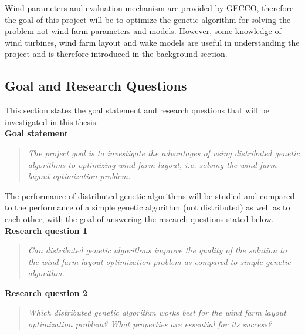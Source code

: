 \noindent Wind parameters and evaluation mechanism are provided by GECCO, therefore the goal of this project will be to optimize the genetic algorithm for solving the problem not wind farm parameters and models. However, some knowledge of wind turbines, wind farm layout and wake models are useful in understanding the project and is therefore introduced in the background section. 


\subsection{Goal and Research Questions}
This section states the goal statement and research questions that will be investigated in this thesis. \\


\noindent \textbf{Goal statement}


\begin{quote}
\textit{The project goal is to investigate the advantages of using distributed genetic algorithms to optimizing wind farm layout, i.e. solving the wind farm layout optimization problem.}
\end{quote}


\noindent The performance of distributed genetic algorithms will be studied and compared to the performance of a simple genetic algorithm (not distributed) as well as to each other, with the goal of answering the research questions stated below.\\


\noindent \textbf{Research question 1}


\begin{quote}
\textit{Can distributed genetic algorithms improve the quality of the solution to the wind farm layout optimization problem as compared to simple genetic algorithm.}
\end{quote}


\noindent \textbf{Research question 2}


\begin{quote}
\textit{Which distributed genetic algorithm works best for the wind farm layout optimization problem? What properties are essential for its success?}
\end{quote}